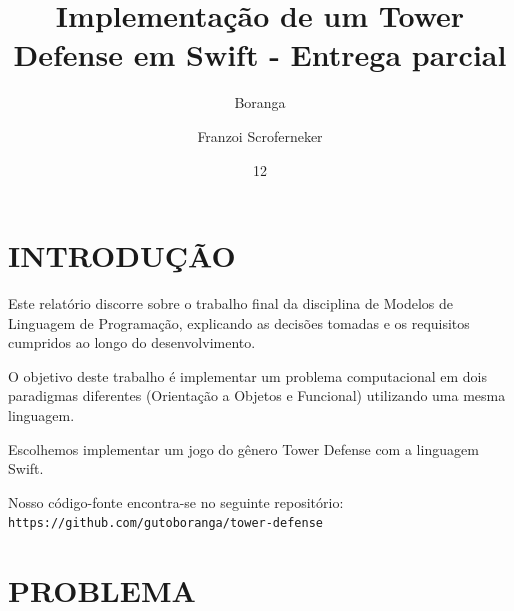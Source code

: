 \documentclass[rel_mlp]{iiufrgs}
\title{Implementação de um Tower Defense em Swift - Entrega parcial}
\author{Boranga}{Augusto} %
\author{Franzoi Scroferneker}{Rodrigo} %
\date{12}{2017}
\newcommand\tab[1][1cm]{\hspace*{#1}}
\begin{document}
\maketitle


\nocite{tower_defense}
\nocite{best_tower_defense}
\nocite{swift}
\nocite{why_learn_swift}
\nocite{o_que_e_paradigma}
\nocite{how_to_use_bibtex}


\tableofcontents






%

\chapter{INTRODUÇÃO} \label{intro}

Este relatório discorre sobre o trabalho final da disciplina de Modelos de Linguagem de Programação, explicando as decisões tomadas e os requisitos cumpridos ao longo do desenvolvimento.

O objetivo deste trabalho é implementar um problema computacional em dois paradigmas diferentes (Orientação a Objetos e Funcional) utilizando uma mesma linguagem.

Escolhemos implementar um jogo do gênero Tower Defense com a linguagem Swift.


Nosso código-fonte encontra-se no seguinte repositório:
\texttt{\\\tab https://github.com/gutoboranga/tower-defense}

%

\chapter{PROBLEMA} \label{intro}
\end{document}
